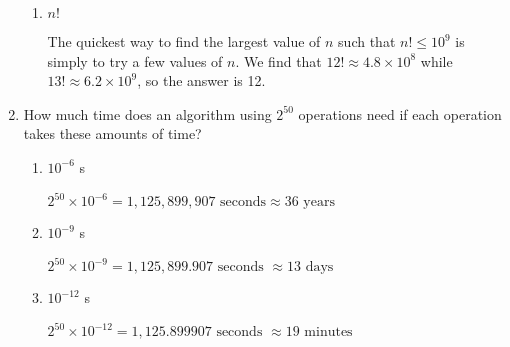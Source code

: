 \documentclass[11pt]{article}
\begin{document}
\begin{enumerate}[label=\textbf{\arabic*.}]
\begin{enumerate}[label=\textbf{\alph*)}]
		\item $n!$
		
		The quickest way to find the largest value of $n$ such that $n! \leq 10^9$ is simply to try a few values of $n$. We find that $12! \approx 4.8 \times 10^8$ while $13! \approx 6.2 \times 10^9$, so the answer is 12.
	\end{enumerate}

	\item How much time does an algorithm using $2^{50}$ operations need if each operation takes these amounts of time?
	
	\begin{enumerate}[label=\textbf{\alph*)}]
		\item $10^{-6}$ s
		
		$2^{50} \times 10^{-6} = 1,125,899,907 \text{ seconds} \approx 36 \text{ years}$
		
		\item $10^{-9}$ s
		
		$2^{50} \times 10^{-9} = 1,125,899.907 \text{ seconds } \approx 13 \text{ days}$
		
		\item $10^{-12}$ s
		
		$2^{50} \times 10^{-12} = 1,125.899907 \text{ seconds } \approx 19 \text{ minutes}$
	\end{enumerate}
\end{enumerate}
\end{document}
